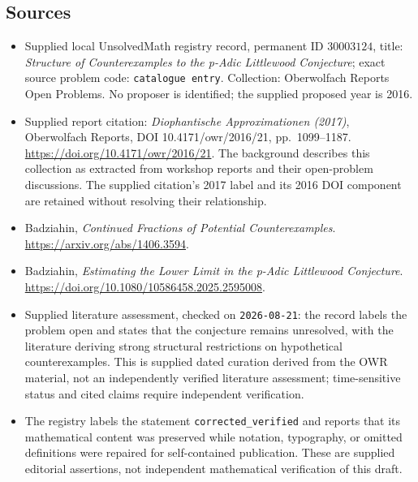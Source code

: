 \documentclass[11pt]{article}
\begin{document}
\subsection{Sources}
\begin{itemize}
\item Supplied local UnsolvedMath registry record, permanent ID \(30003124\), title: \emph{Structure of Counterexamples to the p-Adic Littlewood Conjecture}; exact source problem code: \texttt{catalogue entry}. Collection: Oberwolfach Reports Open Problems. No proposer is identified; the supplied proposed year is 2016.
\item Supplied report citation: \emph{Diophantische Approximationen (2017)}, Oberwolfach Reports, DOI 10.4171/owr/2016/21, pp.\ 1099--1187. \url{https://doi.org/10.4171/owr/2016/21}. The background describes this collection as extracted from workshop reports and their open-problem discussions. The supplied citation's 2017 label and its 2016 DOI component are retained without resolving their relationship.
\item Badziahin, \emph{Continued Fractions of Potential Counterexamples}. \url{https://arxiv.org/abs/1406.3594}.
\item Badziahin, \emph{Estimating the Lower Limit in the p-Adic Littlewood Conjecture}. \url{https://doi.org/10.1080/10586458.2025.2595008}.
\item Supplied literature assessment, checked on \texttt{2026-08-21}: the record labels the problem open and states that the conjecture remains unresolved, with the literature deriving strong structural restrictions on hypothetical counterexamples. This is supplied dated curation derived from the OWR material, not an independently verified literature assessment; time-sensitive status and cited claims require independent verification.
\item The registry labels the statement \texttt{corrected\_verified} and reports that its mathematical content was preserved while notation, typography, or omitted definitions were repaired for self-contained publication. These are supplied editorial assertions, not independent mathematical verification of this draft.
\end{itemize}
\end{document}
